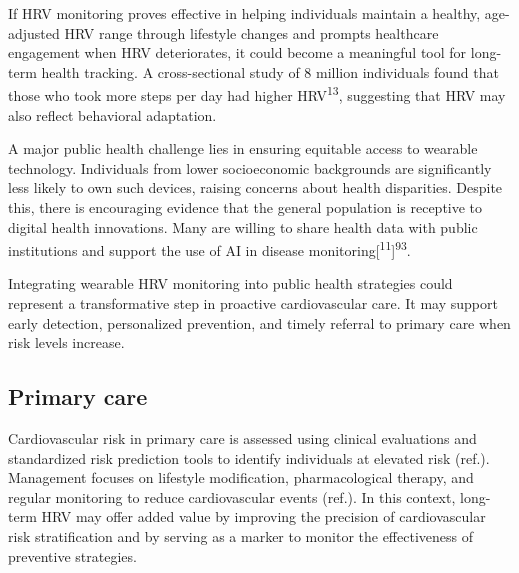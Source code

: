 \documentclass[
  a4paper,
  headsepline=true,
  open=any]{scrbook}
\begin{document}
If HRV monitoring proves effective in helping individuals maintain a
healthy, age-adjusted HRV range through lifestyle changes and prompts
healthcare engagement when HRV deteriorates, it could become a
meaningful tool for long-term health tracking. A cross-sectional study
of 8 million individuals found that those who took more steps per day
had higher HRV\textsuperscript{13}, suggesting that HRV may also reflect
behavioral adaptation.

A major public health challenge lies in ensuring equitable access to
wearable technology. Individuals from lower socioeconomic backgrounds
are significantly less likely to own such devices, raising concerns
about health disparities. Despite this, there is encouraging evidence
that the general population is receptive to digital health innovations.
Many are willing to share health data with public institutions and
support the use of AI in disease
monitoring{[}\textsuperscript{11}{]}\textsuperscript{93}.

Integrating wearable HRV monitoring into public health strategies could
represent a transformative step in proactive cardiovascular care. It may
support early detection, personalized prevention, and timely referral to
primary care when risk levels increase.

\hypertarget{primary-care}{%
\subsection{Primary care}\label{primary-care}}

Cardiovascular risk in primary care is assessed using clinical
evaluations and standardized risk prediction tools to identify
individuals at elevated risk (ref.). Management focuses on lifestyle
modification, pharmacological therapy, and regular monitoring to reduce
cardiovascular events (ref.). In this context, long-term HRV may offer
added value by improving the precision of cardiovascular risk
stratification and by serving as a marker to monitor the effectiveness
of preventive strategies.
\end{document}

